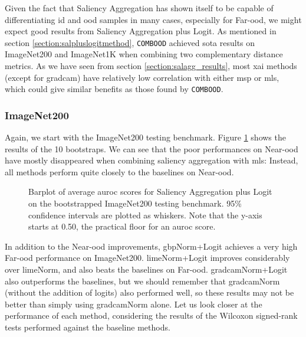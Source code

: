 \documentclass[UKenglish]{uiomasterthesis} %
\theoremstyle{definition}
\begin{document}
Given the fact that Saliency Aggregation has shown itself to be capable of differentiating \ac{id} and \ac{ood} samples in many cases, especially for Far-\ac{ood}, we might expect good results from Saliency Aggregation plus Logit. As mentioned in section \ref{section:salpluslogitmethod}, \texttt{COMBOOD} \cite{combood} achieved \ac{sota} results on ImageNet200 and ImageNet1K when combining two complementary distance metrics. As we have seen from section \ref{section:salagg_results}, most \ac{xai} methods (except for \ac{gradcam}) have relatively low correlation with either \ac{msp} or \ac{mls}, which could give similar benefits as those found by \texttt{COMBOOD}.

\subsubsection{ImageNet200}

Again, we start with the ImageNet200 testing benchmark. Figure \ref{fig:imagenet200_salpluslogit_bootstrap_barplot} shows the results of the 10 bootstraps. We can see that the poor performances on Near-\ac{ood} have mostly disappeared when combining saliency aggregation with \ac{mls}: Instead, all methods perform quite closely to the baselines on Near-\ac{ood}.

\begin{figure}[H]
    \begin{center}
        
    \end{center}
    \caption[ImageNet200 Saliency Aggregation plus Logit Bootstrap]{Barplot of average \ac{auroc} scores for Saliency Aggregation plus Logit on the bootstrapped ImageNet200 testing benchmark. 95\% confidence intervals are plotted as whiskers. Note that the y-axis starts at 0.50, the practical floor for an \ac{auroc} score.}
    \label{fig:imagenet200_salpluslogit_bootstrap_barplot}
\end{figure}

In addition to the Near-\ac{ood} improvements, \ac{gbp}Norm+Logit achieves a very high Far-\ac{ood} performance on ImageNet200. \ac{lime}Norm+Logit improves considerably over \ac{lime}Norm, and also beats the baselines on Far-\ac{ood}. \ac{gradcam}Norm+Logit also outperforms the baselines, but we should remember that \ac{gradcam}Norm (without the addition of logits) also performed well, so these results may not be better than simply using \ac{gradcam}Norm alone. Let us look closer at the performance of each method, considering the results of the Wilcoxon signed-rank tests performed against the baseline methods.
\end{document}

